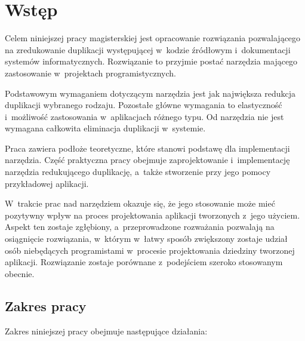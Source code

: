 \chapter{Wstęp} \label{chap:intro}

Celem niniejszej pracy magisterskiej jest opracowanie rozwiązania pozwalającego na zredukowanie duplikacji występującej w~kodzie źródłowym i~dokumentacji systemów informatycznych.
Rozwiązanie to przyjmie postać narzędzia mającego zastosowanie w~projektach programistycznych.

Podstawowym wymaganiem dotyczącym narzędzia jest jak największa redukcja duplikacji wybranego rodzaju.
Pozostałe główne wymagania to elastyczność i~możliwość zastosowania w~aplikacjach różnego typu.
Od narzędzia nie jest wymagana całkowita eliminacja duplikacji w~systemie.

Praca zawiera podłoże teoretyczne, które stanowi podstawę dla implementacji narzędzia.
Część praktyczna pracy obejmuje zaprojektowanie i~implementację narzędzia redukującego duplikację, a~także stworzenie przy jego pomocy przykładowej aplikacji.

W~trakcie prac nad narzędziem okazuje się, że jego stosowanie może mieć pozytywny wpływ na proces projektowania aplikacji tworzonych z~jego użyciem.
Aspekt ten zostaje zgłębiony, a~przeprowadzone rozważania pozwalają na osiągnięcie rozwiązania, w~którym w~łatwy sposób zwiększony zostaje udział osób niebędących programistami w~procesie projektowania dziedziny tworzonej aplikacji.
Rozwiązanie zostaje porównane z~podejściem szeroko stosowanym obecnie.



\section{Zakres pracy}

Zakres niniejszej pracy obejmuje następujące działania:

